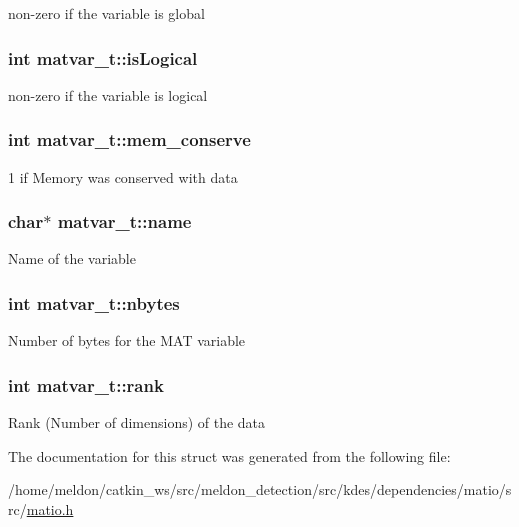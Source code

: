 non-\/zero if the variable is global \hypertarget{structmatvar__t_a866c1539e68073a837833d74cd4a65be}{
\subsubsection[{is\-Logical}]{\setlength{\rightskip}{0pt plus 5cm}int matvar\-\_\-t\-::is\-Logical}}\label{structmatvar__t_a866c1539e68073a837833d74cd4a65be}
non-\/zero if the variable is logical \hypertarget{structmatvar__t_aff20e87a00691c97340ab07656a13ee7}{
\subsubsection[{mem\-\_\-conserve}]{\setlength{\rightskip}{0pt plus 5cm}int matvar\-\_\-t\-::mem\-\_\-conserve}}\label{structmatvar__t_aff20e87a00691c97340ab07656a13ee7}
1 if Memory was conserved with data \hypertarget{structmatvar__t_a5f03073a500dae5824d0c7895ae60df9}{
\subsubsection[{name}]{\setlength{\rightskip}{0pt plus 5cm}char$\ast$ matvar\-\_\-t\-::name}}\label{structmatvar__t_a5f03073a500dae5824d0c7895ae60df9}
Name of the variable \hypertarget{structmatvar__t_ae6e0987fef1e35a7e4d0a78b27648035}{
\subsubsection[{nbytes}]{\setlength{\rightskip}{0pt plus 5cm}int matvar\-\_\-t\-::nbytes}}\label{structmatvar__t_ae6e0987fef1e35a7e4d0a78b27648035}
Number of bytes for the M\-A\-T variable \hypertarget{structmatvar__t_a84ba70c96ded13cc555fa75b768d9921}{
\subsubsection[{rank}]{\setlength{\rightskip}{0pt plus 5cm}int matvar\-\_\-t\-::rank}}\label{structmatvar__t_a84ba70c96ded13cc555fa75b768d9921}
Rank (Number of dimensions) of the data 

The documentation for this struct was generated from the following file\-:\begin{DoxyCompactItemize}
\item 
/home/meldon/catkin\-\_\-ws/src/meldon\-\_\-detection/src/kdes/dependencies/matio/src/\hyperlink{matio_8h}{matio.\-h}\end{DoxyCompactItemize}
